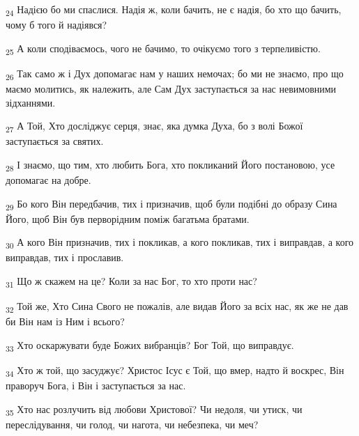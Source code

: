 \begin{tcolorbox}
\textsubscript{24} Надією бо ми спаслися. Надія ж, коли бачить, не є надія, бо хто що бачить, чому б того й надіявся?
\end{tcolorbox}
\begin{tcolorbox}
\textsubscript{25} А коли сподіваємось, чого не бачимо, то очікуємо того з терпеливістю.
\end{tcolorbox}
\begin{tcolorbox}
\textsubscript{26} Так само ж і Дух допомагає нам у наших немочах; бо ми не знаємо, про що маємо молитись, як належить, але Сам Дух заступається за нас невимовними зідханнями.
\end{tcolorbox}
\begin{tcolorbox}
\textsubscript{27} А Той, Хто досліджує серця, знає, яка думка Духа, бо з волі Божої заступається за святих.
\end{tcolorbox}
\begin{tcolorbox}
\textsubscript{28} І знаємо, що тим, хто любить Бога, хто покликаний Його постановою, усе допомагає на добре.
\end{tcolorbox}
\begin{tcolorbox}
\textsubscript{29} Бо кого Він передбачив, тих і призначив, щоб були подібні до образу Сина Його, щоб Він був перворідним поміж багатьма братами.
\end{tcolorbox}
\begin{tcolorbox}
\textsubscript{30} А кого Він призначив, тих і покликав, а кого покликав, тих і виправдав, а кого виправдав, тих і прославив.
\end{tcolorbox}
\begin{tcolorbox}
\textsubscript{31} Що ж скажем на це? Коли за нас Бог, то хто проти нас?
\end{tcolorbox}
\begin{tcolorbox}
\textsubscript{32} Той же, Хто Сина Свого не пожалів, але видав Його за всіх нас, як же не дав би Він нам із Ним і всього?
\end{tcolorbox}
\begin{tcolorbox}
\textsubscript{33} Хто оскаржувати буде Божих вибранців? Бог Той, що виправдує.
\end{tcolorbox}
\begin{tcolorbox}
\textsubscript{34} Хто ж той, що засуджує? Христос Ісус є Той, що вмер, надто й воскрес, Він праворуч Бога, і Він і заступається за нас.
\end{tcolorbox}
\begin{tcolorbox}
\textsubscript{35} Хто нас розлучить від любови Христової? Чи недоля, чи утиск, чи переслідування, чи голод, чи нагота, чи небезпека, чи меч?
\end{tcolorbox}
